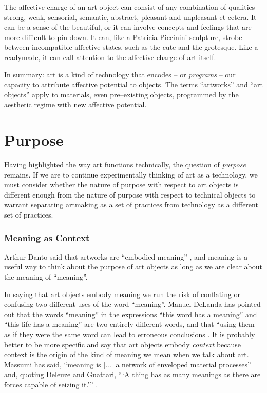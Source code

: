 \documentclass[letterpaper]{article}
\begin{document}
    The affective charge of an art object can consist of any combination of qualities – strong, weak, sensorial, semantic, abstract, pleasant and unpleasant et cetera. It can be a sense of the beautiful, or it can involve concepts and feelings that are more difficult to pin down. It can, like a Patricia Piccinini sculpture, strobe between incompatible affective states, such as the cute and the grotesque. Like a readymade, it can call attention to the affective charge of art itself.

    In summary: art is a kind of technology that encodes – or \emph{programs} – our capacity to attribute affective potential to objects. The terms “artworks” and “art objects” apply to materials, even pre–existing objects, programmed by the aesthetic regime with new affective potential.
    
\section{Purpose}

    Having highlighted the way art functions technically, the question of \emph{purpose} remains. If we are to continue experimentally thinking of art as a technology, we must consider whether the nature of purpose with respect to art objects is different enough from the nature of purpose with respect to technical objects to warrant separating artmaking as a set of practices from technology as a different set of practices.
    
    \subsubsection{Meaning as Context}

    Arthur Danto said that artworks are “embodied meaning” \citep[p.125]{DantoEmbdMnngs2007}, and meaning is a useful way to think about the purpose of art objects as long as we are clear about the meaning of “meaning”.
    
    In saying that art objects embody meaning we run the risk of conflating or confusing two different uses of the word “meaning”. Manuel DeLanda has pointed out that the words “meaning” in the expressions “this word has a meaning” and “this life has a meaning” are two entirely different words, and that “using them as if they were the same word can lead to erroneous conclusions \citep[pp.40–41]{DeLandaCsltyAndMnng2018}. It is probably better to be more specific and say that art objects embody \emph{context} because context is the origin of the kind of meaning we mean when we talk about art. Massumi has said, “meaning is [...] a network of enveloped material processes” and, quoting Deleuze and Guattari, “‘A thing has as many meanings as there are forces capable of seizing it.’” \citep[p.10]{MassumiAUsrsGdTCptlsmAndSchzphrn1992}.
\end{document}
